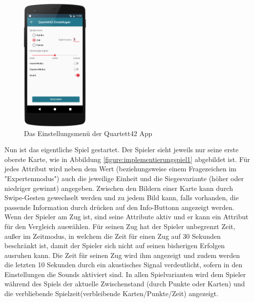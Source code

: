 \begin{figure}[htp]
	\centering
  	\includegraphics[width=0.3\textwidth]{img/screenshots/device_settings.png}
	\caption{Das Einstellungsmenü der Quartett42 App}
	\label{figure:implementierungeinstellungen}
\end{figure}

Nun ist das eigentliche Spiel gestartet. Der Spieler sieht jeweils nur seine erste oberste Karte, wie in Abbildung \ref{figure:implementierungspiel1} abgebildet ist. Für jedes Attribut wird neben dem Wert (beziehungsweise einem Fragezeichen im "Expertenmodus") auch die jeweilige Einheit und die Siegesvariante (höher oder niedriger gewinnt) angegeben. Zwischen den Bildern einer Karte kann durch Swipe-Gesten gewechselt werden und zu jedem Bild kann, falls vorhanden, die passende Information durch drücken auf den Info-Buttonn angezeigt werden. Wenn der Spieler am Zug ist, sind seine Attribute aktiv und er kann ein Attribut für den Vergleich auswählen. Für seinen Zug hat der Spieler unbegrenzt Zeit, außer im Zeitmodus, in welchem die Zeit für einen Zug auf 30 Sekunden beschränkt ist, damit der Spieler sich nicht auf seinen bisherigen Erfolgen ausruhen kann. Die Zeit für seinen Zug wird ihm angezeigt und zudem werden die letzten 10 Sekunden durch ein akustisches Signal verdeutlicht, sofern in den Einstellungen die Sounds aktiviert sind. In allen Spielvarianten wird dem Spieler während des Spiels der aktuelle Zwischenstand (durch Punkte oder Karten) und die verbliebende Spielzeit(verbleibende Karten/Punkte/Zeit) angezeigt.

